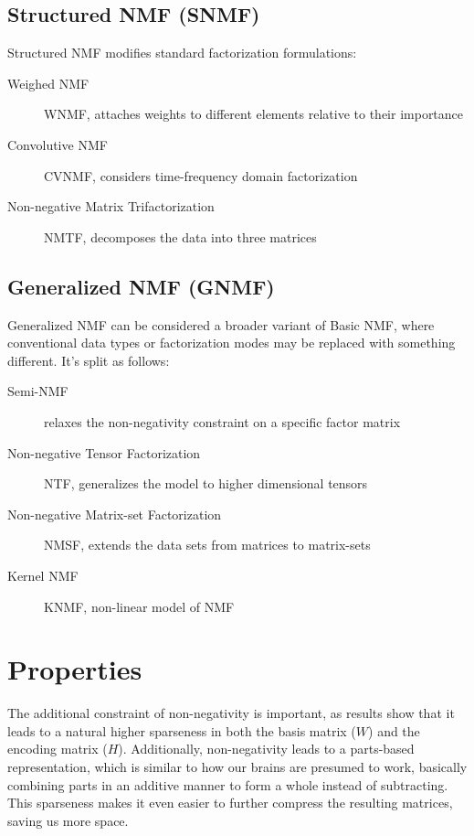 \subsection{Structured NMF (SNMF)}
Structured NMF modifies standard factorization formulations:

\begin{description}
	\item[Weighed NMF] WNMF, attaches weights to different elements relative to their importance
	\item[Convolutive NMF] CVNMF, considers time-frequency domain factorization
	\item[Non-negative Matrix Trifactorization] NMTF, decomposes the data into three matrices
\end{description}

\subsection{Generalized NMF (GNMF)}
Generalized NMF can be considered a broader variant of Basic NMF, where conventional data types or factorization modes may be replaced with something different. It's split as follows:

\begin{description}
	\item[Semi-NMF] relaxes the non-negativity constraint on a specific factor matrix
	\item[Non-negative Tensor Factorization] NTF, generalizes the model to higher dimensional tensors
	\item[Non-negative Matrix-set Factorization] NMSF, extends the data sets from matrices to matrix-sets
	\item[Kernel NMF] KNMF, non-linear model of NMF
\end{description}

\section{Properties}
The additional constraint of non-negativity is important, as results show that it leads to a natural higher sparseness in both the basis matrix ($W$) and the encoding matrix ($H$). Additionally, non-negativity leads to a parts-based representation, which is similar to how our brains are presumed to work, basically combining parts in an additive manner to form a whole instead of subtracting. \cite{nmf_parts_objects} This sparseness makes it even easier to further compress the resulting matrices, saving us more space.

